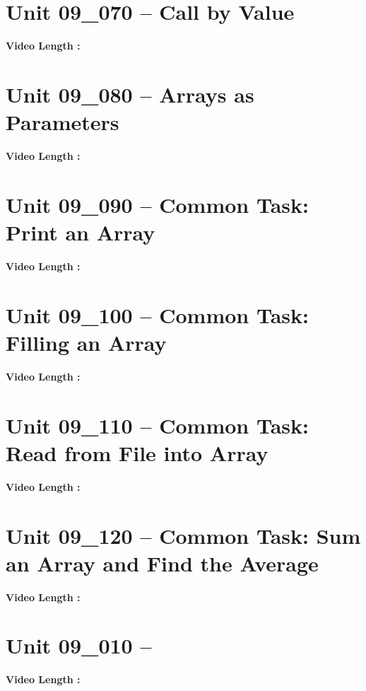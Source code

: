 \documentclass[letterpaper,12pt]{exam}
\newcommand{\unit}{Unit 09}
\begin{document}
\begin{questions}
\section*{\unit\_070 -- Call by Value } 
\par{\selectfont\textbf{Video Length :}}

\section*{\unit\_080 -- Arrays as Parameters} 
\par{\selectfont\textbf{Video Length :}}

\section*{\unit\_090 -- Common Task: Print an Array} 
\par{\selectfont\textbf{Video Length :}}

\section*{\unit\_100 -- Common Task: Filling an Array} 
\par{\selectfont\textbf{Video Length :}}
\section*{\unit\_110 -- Common Task: Read from File into Array} 
\par{\selectfont\textbf{Video Length :}}
\section*{\unit\_120 -- Common Task: Sum an Array and Find the Average} 
\par{\selectfont\textbf{Video Length :}}
\section*{\unit\_010 -- } 
\par{\selectfont\textbf{Video Length :}}





\end{questions}
\end{document}
